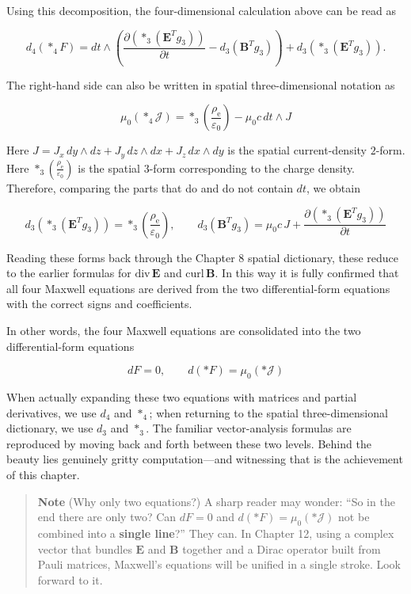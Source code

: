 \documentclass[a4paper,12pt,openany]{book}
\begin{document}
Using this decomposition, the four-dimensional calculation above can be
read as

\[
d_4(\ast_4F)
=
dt\wedge\left(
\frac{\partial(\ast_3(\mathbf E^Tg_3))}{\partial t}
-
d_3(\mathbf B^Tg_3)
\right)
+
d_3(\ast_3(\mathbf E^Tg_3)).
\]

The right-hand side can also be written in spatial three-dimensional
notation as

\[
\mu_0(\ast_4\mathcal J)=\ast_3\left(\frac{\rho_{\mathrm e}}{\varepsilon_0}\right)-\mu_0 c\,dt\wedge J
\]

Here \(J=J_x\,dy\wedge dz+J_y\,dz\wedge dx+J_z\,dx\wedge dy\) is the
spatial current-density \(2\)-form. Here
\(\ast_3\left(\frac{\rho_{\mathrm e}}{\varepsilon_0}\right)\) is the
spatial \(3\)-form corresponding to the charge density. Therefore,
comparing the parts that do and do not contain \(dt\), we obtain

\[
d_3(\ast_3(\mathbf E^Tg_3))=\ast_3\left(\frac{\rho_{\mathrm e}}{\varepsilon_0}\right),
\qquad
d_3(\mathbf B^Tg_3)=\mu_0 c\,J+\frac{\partial(\ast_3(\mathbf E^Tg_3))}{\partial t}
\]

Reading these forms back through the Chapter 8 spatial dictionary, these
reduce to the earlier formulas for \(\mathrm{div}\,\mathbf E\) and
\(\mathrm{curl}\,\mathbf B\). In this way it is fully confirmed that all
four Maxwell equations are derived from the two differential-form
equations with the correct signs and coefficients.

In other words, the four Maxwell equations are consolidated into the two
differential-form equations

\[dF = 0, \qquad d(\ast F) = \mu_0(\ast\mathcal{J})\]

When actually expanding these two equations with matrices and partial
derivatives, we use \(d_4\) and \(\ast_4\); when returning to the
spatial three-dimensional dictionary, we use \(d_3\) and \(\ast_3\). The
familiar vector-analysis formulas are reproduced by moving back and
forth between these two levels. Behind the beauty lies genuinely gritty
computation—and witnessing that is the achievement of this chapter.

\begin{quote}
\textbf{Note} (Why only two equations?) A sharp reader may wonder: ``So
in the end there are only two? Can \(dF=0\) and
\(d(\ast F)=\mu_0(\ast\mathcal{J})\) not be combined into a
\textbf{single line}?'' They can. In Chapter 12, using a complex vector
that bundles \(\mathbf{E}\) and \(\mathbf{B}\) together and a Dirac
operator built from Pauli matrices, Maxwell's equations will be unified
in a single stroke. Look forward to it.
\end{quote}
\end{document}

